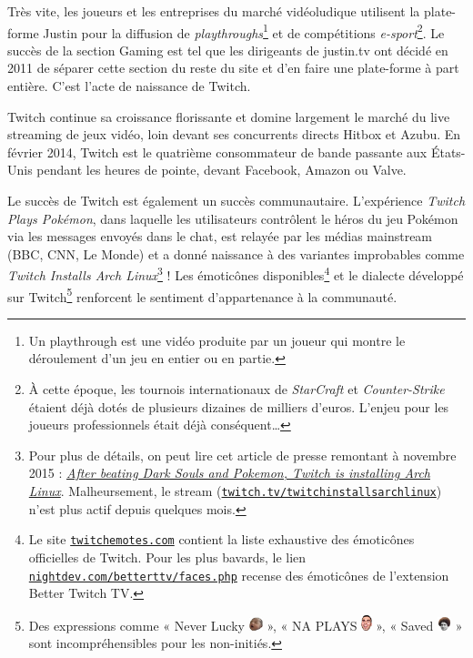 \documentclass[a4paper]{article}
\begin{document}
Très vite, les joueurs et les entreprises du marché vidéoludique utilisent la plate-forme Justin pour la diffusion de \textit{playthroughs}\footnote{Un playthrough est une vidéo produite par un joueur qui montre le déroulement d'un jeu en entier ou en partie.} et de compétitions \textit{e-sport}\footnote{À cette époque, les tournois internationaux de \textit{StarCraft} et \textit{Counter-Strike} étaient déjà dotés de plusieurs dizaines de milliers d'euros. L'enjeu pour les joueurs professionnels était déjà conséquent\ldots}. Le succès de la section Gaming est tel que les dirigeants de justin.tv ont décidé en 2011 de séparer cette section du reste du site et d'en faire une plate-forme à part entière. C'est l'acte de naissance de Twitch\cite{BW2011}.

Twitch continue sa croissance florissante et domine largement le marché du live streaming de jeux vidéo, loin devant ses concurrents directs Hitbox et Azubu. En février 2014, Twitch est le quatrième consommateur de bande passante aux États-Unis pendant les heures de pointe, devant Facebook, Amazon ou Valve\cite{Polygon2014}. 

Le succès de Twitch est également un succès communautaire. L'expérience \textit{Twitch Plays Pokémon}, dans laquelle les utilisateurs contrôlent le héros du jeu Pokémon via les messages envoyés dans le chat, est relayée par les médias mainstream (BBC, CNN, Le Monde) et a donné naissance à des variantes improbables comme \textit{Twitch Installs Arch Linux}\footnote{Pour plus de détails, on peut lire cet article de presse remontant à novembre 2015 : \href{http://www.pcworld.com/article/3001378/operating-systems/after-beating-dark-souls-and-pokemon-twitch-is-installing-arch-linux.html}{\textit{After beating Dark Souls and Pokemon, Twitch is installing Arch Linux}}. Malheursement, le stream (\href{https://www.twitch.tv/twitchinstallsarchlinux}{\texttt{twitch.tv/twitchinstallsarchlinux}}) n'est plus actif depuis quelques mois.} ! Les émoticônes disponibles\footnote{Le site \href{https://twitchemotes.com/}{\texttt{twitchemotes.com}} contient la liste exhaustive des émoticônes officielles de Twitch. Pour les plus bavards, le lien \href{https://nightdev.com/betterttv/faces.php}{\texttt{nightdev.com/betterttv/faces.php}} recense des émoticônes de l'extension Better Twitch TV.} et le dialecte développé sur Twitch\footnote{Des expressions comme « Never Lucky \includegraphics[width=0.4cm]{BabyRage.jpg} », « NA PLAYS \includegraphics[width=0.3cm]{4Head.png} », « Saved \includegraphics[width=0.4cm]{KappaRoss.png} » sont incompréhensibles pour les non-initiés.} renforcent le sentiment d'appartenance à la communauté.
\end{document}
